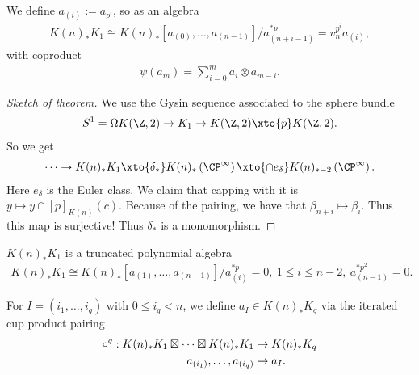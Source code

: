 \begin{corollary} We define $a_{(i)} := a_{p^i}$, so as an algebra
\begin{align*}
    K(n)_\ast K_1 \cong K(n)_\ast \left[ a_{(0)}, \ldots, a_{(n-1)} \right] \big/ a_{(n+i-1)}^{\ast p} = v_n^{p^i} a_{(i)},
\end{align*}
with coproduct
\begin{align*}
        \psi(a_m) = \sum_{i=0}^m a_i \otimes a_{m-i}.
    \end{align*}
\end{corollary}

\begin{proof}[Sketch of theorem] We use the Gysin sequence associated to the sphere bundle
\begin{align*}
    S^1 = \Omega K(\Z,2) \to K_1 \to K(\Z,2) \xto{p} K(\Z,2).
\end{align*}
So we get
\begin{align*}
    \cdots \to K(n)_\ast K_1 \xto{\delta_\ast} K(n)_\ast \left( \CP^\infty \right) \xto{\cap e_\delta} K(n)_{\ast - 2} \left( \CP^\infty \right).
\end{align*}
Here $e_\delta$ is the Euler class. We claim that capping with it is $y \mapsto y \cap [p]_{K(n)}(c)$. Because of the pairing, we have that $\beta_{n+i} \mapsto \beta_i$. Thus this map is surjective! Thus $\delta_\ast$ is a monomorphism.
\end{proof}

\begin{remark} $K(n)_\ast K_1$ is a truncated polynomial algebra
\begin{align*}
    K(n)_\ast K_1 \cong K(n)_\ast \left[ a_{(1)}, \ldots, a_{(n-1)} \right] \big/ a_{(i)}^{\ast p} = 0,\ 1\le i\le n-2,\ a_{(n-1)}^{\ast p^2} = 0.
\end{align*}
\end{remark}

\begin{notation} For $I = \left( i_1, \ldots, i_q \right)$ with $0 \le i_q < n$, we define $a_I \in K(n)_\ast K_q$ via the iterated cup product pairing
\begin{align*}
    \circ^q : K(n)_\ast K_1 \boxtimes \cdots \boxtimes K(n)_\ast K_1 &\to K(n)_\ast K_q \\
    a_{(i_1)}, \ldots, a_{(i_q)} &\mapsto a_I.
\end{align*}
\end{notation}

